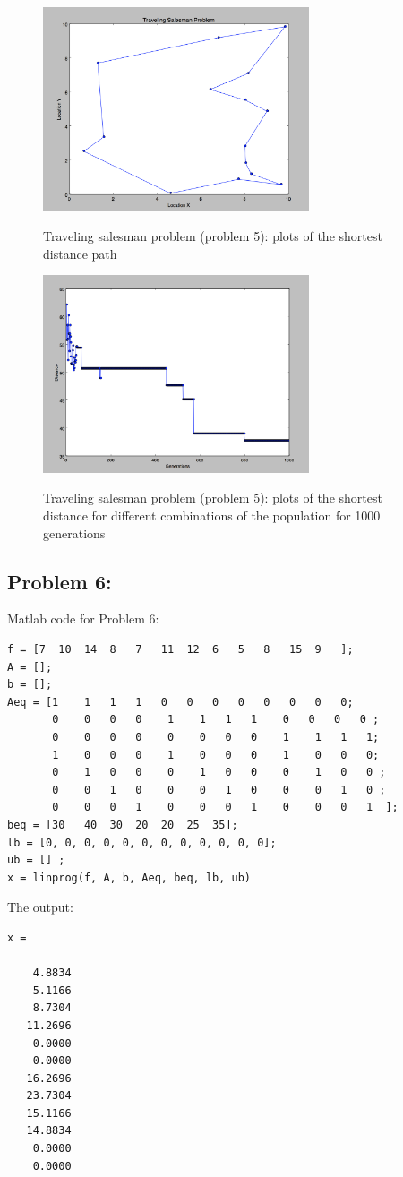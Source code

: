 \documentclass{article}
\begin{document}
\begin{figure}[h]
\includegraphics[width=0.7\textwidth]{Traveling_salesman_path}
\centering
\caption{Traveling salesman problem (problem 5): plots of the shortest distance path}
\label{fig:tsp1}

\includegraphics[width=0.7\textwidth]{Distance_vs_generation}
\label{fig:tsp2}
\centering
\caption{Traveling salesman problem (problem 5): plots of the shortest distance for different combinations of the population for 1000 generations}

\end{figure}

\subsection*{{Problem 6: }}


Matlab code for Problem 6: \\
\begin{lstlisting} 
f = [7  10  14  8   7   11  12  6   5   8   15  9   ]; 
A = [];
b = [];
Aeq = [1    1   1   1	0   0   0   0   0   0   0   0; 
       0    0   0   0    1    1   1   1    0   0   0   0 ; 
       0    0   0   0    0    0   0   0    1    1   1   1; 
       1    0   0   0    1    0   0   0    1    0   0   0; 
       0    1   0   0    0    1   0   0    0    1   0   0 ; 
       0    0   1   0    0    0   1   0    0    0   1   0 ;   
       0    0   0   1    0    0   0   1    0    0   0   1  ]; 
beq = [30   40  30  20  20  25  35];
lb = [0, 0, 0, 0, 0, 0, 0, 0, 0, 0, 0, 0]; 
ub = [] ; 
x = linprog(f, A, b, Aeq, beq, lb, ub) 
\end{lstlisting}
The output: 
\begin{lstlisting}
x =

    4.8834
    5.1166
    8.7304
   11.2696
    0.0000
    0.0000
   16.2696
   23.7304
   15.1166
   14.8834
    0.0000
    0.0000
\end{lstlisting}
\end{document}
